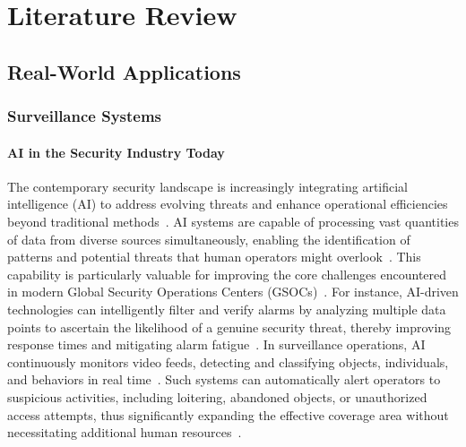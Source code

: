 \section{Literature Review}

\subsection{Real-World Applications}

\subsubsection{Surveillance Systems}

\paragraph{AI in the Security Industry Today}
The contemporary security landscape is increasingly integrating artificial intelligence (AI) to address evolving threats and enhance operational efficiencies beyond traditional methods~\cite{securityindustry_2025_transforming}. AI systems are capable of processing vast quantities of data from diverse sources simultaneously, enabling the identification of patterns and potential threats that human operators might overlook~\cite{securityindustry_2025_transforming}. This capability is particularly valuable for improving the core challenges encountered in modern Global Security Operations Centers (GSOCs)~\cite{securityindustry_2025_transforming}. For instance, AI-driven technologies can intelligently filter and verify alarms by analyzing multiple data points to ascertain the likelihood of a genuine security threat, thereby improving response times and mitigating alarm fatigue~\cite{securityindustry_2025_transforming}. In surveillance operations, AI continuously monitors video feeds, detecting and classifying objects, individuals, and behaviors in real time~\cite{securityindustry_2025_transforming}. Such systems can automatically alert operators to suspicious activities, including loitering, abandoned objects, or unauthorized access attempts, thus significantly expanding the effective coverage area without necessitating additional human resources~\cite{securityindustry_2025_transforming}.

